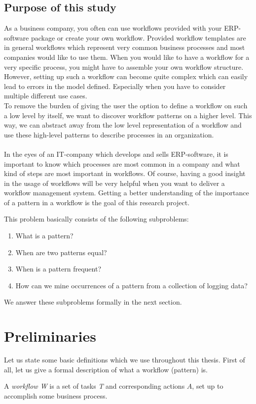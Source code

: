 \documentclass[a4paper,11pt]{article}
\begin{document}
\subsection{Purpose of this study}
As a business company, you often can use workflows provided with your ERP-software package or create your own workflow. Provided workflow templates are in general workflows which represent very common business processes and most companies would like to use them. When you would like to have a workflow for a very specific process, you might have to assemble your own workflow structure. However, setting up such a workflow can become quite complex which can easily lead to errors in the model defined. Especially when you have to consider multiple different use cases.\\
To remove the burden of giving the user the option to define a workflow on such a low level by itself, we want to discover workflow patterns on a higher level. This way, we can abstract away from the low level representation of a workflow and use these high-level patterns to describe processes in an organization.\\
\\
In the eyes of an IT-company which develops and sells ERP-software, it is important to know which processes are most common in a company and what kind of steps are most important in workflows. Of course, having a good insight in the usage of workflows will be very helpful when you want to deliver a workflow management system. Getting a better understanding of the importance of a pattern in a workflow is the goal of this research project.

This problem basically consists of the following subproblems:
\begin{enumerate}
\item What is a pattern?
\item When are two patterns equal?
\item When is a pattern frequent?
\item How can we mine occurrences of a pattern from a collection of logging data?
\end{enumerate}
We answer these subproblems formally in the next section.

\section{Preliminaries}
Let us state some basic definitions which we use throughout this thesis.
First of all, let us give a formal description of what a workflow (pattern) is.
\begin{defn}[Workflow]
A \textit{workflow W} is a set of tasks \textit{T} and corresponding actions $A$, set up to accomplish some business process.
\end{defn}
\end{document}
